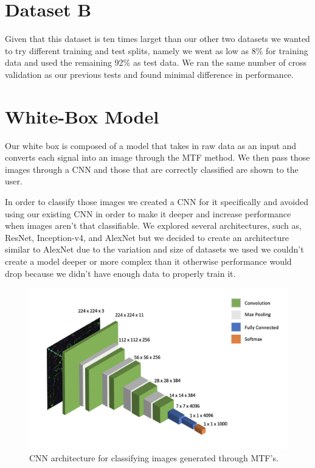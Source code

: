 \documentclass{turabian-thesis}
\begin{document}
\section{Dataset B}

Given that this dataset is ten times larget than our other two datasets we wanted to try different training and test splits, namely we went as low as 8\% for training data and used the remaining 92\% as test data. We ran the same number of cross validation as our previous tests and found minimal difference in performance.



\section{White-Box Model}
Our white box is composed of a model that takes in raw data as an input and converts each signal into an image through the MTF method. We then pass those images through a CNN and those that are correctly classified are shown to the user.

In order to classify those images we created a CNN for it specifically and avoided using our existing CNN in order to make it deeper and increase performance when images aren’t that classifiable. We explored several architectures, such as, ResNet, Inception-v4, and AlexNet but we decided to create an architecture similar to AlexNet due to the variation and size of datasets we used we couldn’t create a model deeper or more complex than it otherwise performance would drop because we didn’t have enough data to properly train it.


\begin{figure}[h!]
   \begin{center}
      \includegraphics[scale=.7]{../media/2d_cnn.png}
   \end{center}
   \caption{CNN architecture for classifying images generated through MTF's.}
   \label{fig:mtf_cnn_results}
\end{figure}
\end{document}
